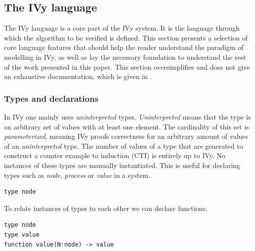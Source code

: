 \documentclass[fleqn]{article}
\begin{document}
\subsection{The IVy language}
The IVy language is a core part of the IVy system. It is the language through which the algorithm to be verified is defined.
This section presents a selection of core language features that should help the reader understand the paradigm of modelling in IVy, as well as lay the necessary foundation to understand
the rest of the work presented in this paper. This section oversimplifies and does not give an exhaustive documentation, which is given in \cite{refLanguageDoc}.

\subsubsection{Types and declarations}
In IVy one mainly uses \textit{uninterpreted} types. \textit{Uninterpreted} means that the type is an arbitrary set of values with at least one element.
The cardinality of this set is \textit{parameterized}, meaning IVy proofs correctness for an arbitrary amount of values of an \textit{uninterpreted} type.
The number of values of a type that are generated to construct a counter example to induction (CTI) is entirely up to IVy. No instances of these types are manually instantiated.
This is useful for declaring types such as \textit{node}, \textit{process} or \textit{value} in a system.

\begin{mdframed}[backgroundcolor=light-gray, roundcorner=10pt,leftmargin=1, rightmargin=1, innerleftmargin=15, innertopmargin=15,innerbottommargin=15, outerlinewidth=1, linecolor=light-gray]
\begin{lstlisting}
type node
\end{lstlisting}
\end{mdframed}

\noindent To relate instances of types to each other we can declare functions.

\begin{mdframed}[backgroundcolor=light-gray, roundcorner=10pt,leftmargin=1, rightmargin=1, innerleftmargin=15, innertopmargin=15,innerbottommargin=15, outerlinewidth=1, linecolor=light-gray]
\begin{lstlisting}
type node
type value
function value(N:node) -> value
\end{lstlisting}
\end{mdframed}
\end{document}
